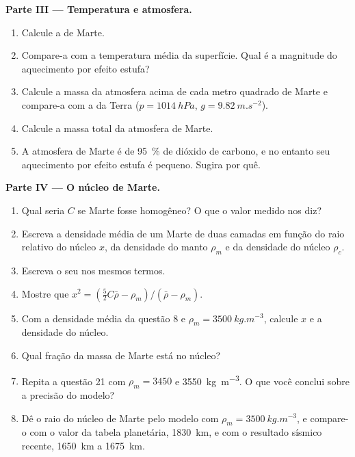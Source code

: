 \begin{problem}
\medskip
\noindent\textbf{Parte III --- Temperatura e atmosfera.}
\begin{enumerate}[resume]
  \item Calcule a  de Marte.
  \item Compare-a com a temperatura média da superfície. Qual é a magnitude do aquecimento por efeito estufa?
  \item Calcule a massa da atmosfera acima de cada metro quadrado de Marte e compare-a com a da Terra ($p = \qty{1014}{hPa}$, $g = \qty{9.82}{m.s^{-2}}$).
  \item Calcule a massa total da atmosfera de Marte.
  \item A atmosfera de Marte é de \qty{95}{\percent} de dióxido de carbono, e no entanto seu aquecimento por efeito estufa é pequeno. Sugira por quê.
\end{enumerate}

\medskip
\noindent\textbf{Parte IV --- O núcleo de Marte.}
\begin{enumerate}[resume]
  \item Qual seria $C$ se Marte fosse homogêneo? O que o valor medido nos diz?
  \item Escreva a densidade média de um Marte de duas camadas em função do raio relativo do núcleo $x$, da densidade do manto $\rho_m$ e da densidade do núcleo $\rho_c$.
  \item Escreva o seu  nos mesmos termos.
  \item Mostre que $x^2 = (\tfrac52C\bar\rho - \rho_m)/(\bar\rho - \rho_m)$.
  \item Com a densidade média da questão 8 e $\rho_m =
        \qty{3500}{kg.m^{-3}}$, calcule $x$ e a densidade do núcleo.
  \item Qual fração da massa de Marte está no núcleo?
  \item Repita a questão 21 com $\rho_m = 3450$ e
        \qty{3550}{kg.m^{-3}}. O que você conclui sobre a precisão do modelo?
  \item Dê o raio do núcleo de Marte pelo modelo com
        $\rho_m = \qty{3500}{kg.m^{-3}}$, e compare-o com o valor da tabela planetária, \qty{1830}{km}, e com o resultado sísmico recente, \qty{1650}{km} a \qty{1675}{km}.
\end{enumerate}
\end{problem}
